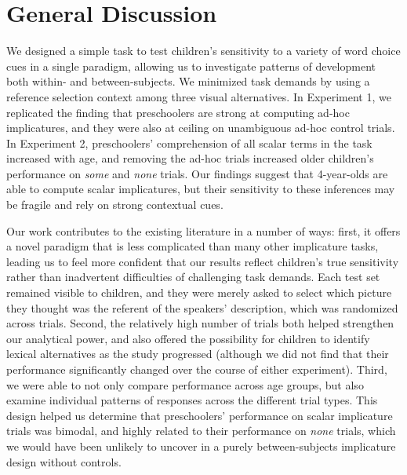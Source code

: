 \documentclass[10pt,letterpaper]{article}
\begin{document}
 \section{General Discussion} 
 
We designed a simple task to test children's sensitivity to a variety of word choice cues in a single paradigm, allowing us to investigate patterns of development both within- and between-subjects. We minimized task demands by using a reference selection context among three visual alternatives. In Experiment 1, we replicated the finding that preschoolers are strong at computing ad-hoc implicatures, and they were also at ceiling on unambiguous ad-hoc control trials. In Experiment 2, preschoolers' comprehension of all scalar terms in the task increased with age, and removing the ad-hoc trials increased older children's performance on \emph{some} and \emph{none} trials. Our findings suggest that 4-year-olds are able to compute scalar implicatures, but their sensitivity to these inferences may be fragile and rely on strong contextual cues. 

Our work contributes to the existing literature in a number of ways: first, it offers a novel paradigm that is less complicated than many other implicature tasks, leading us to feel more confident that our results reflect children's true sensitivity rather than inadvertent difficulties of challenging task demands. Each test set remained visible to children, and they were merely asked to select which picture they thought was the referent of the speakers' description, which was randomized across trials. Second, the relatively high number of trials both helped strengthen our analytical power, and also offered the possibility for children to identify lexical alternatives as the study progressed (although we did not find that their performance significantly changed over the course of either experiment). Third, we were able to not only compare performance across age groups, but also examine individual patterns of responses across the different trial types. This design helped us determine that preschoolers' performance on scalar implicature trials was bimodal, and highly related to their performance on \emph{none} trials, which we would have been unlikely to uncover in a purely between-subjects implicature design without controls. 
\end{document}
